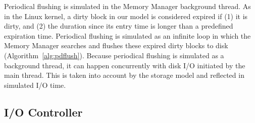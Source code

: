 \documentclass[conference]{IEEEtran}
\begin{document}
    Periodical flushing is simulated in the Memory Manager
    background thread. As in the Linux kernel, a dirty block
    in our model is considered expired if (1) it is dirty, and (2)
    the duration since its entry time is longer than a
    predefined expiration time. 
    Periodical flushing is simulated as an infinite loop in which 
    the Memory Manager searches and flushes these expired dirty blocks to disk (Algorithm~\ref{alg:pdflush}). 
    Because periodical flushing is simulated as a background thread, it can happen concurrently
    with disk I/O initiated by the main thread. This is taken into account by the 
    storage model and reflected in simulated I/O time.

    \subsection{I/O Controller}
     
\end{document}
